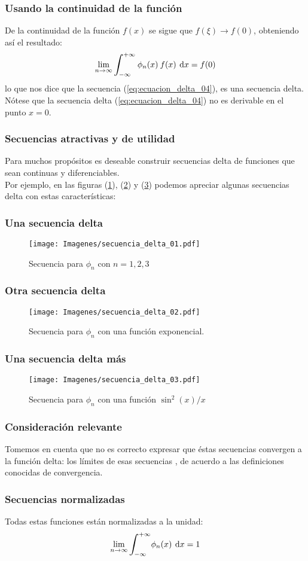 \documentclass[12pt]{beamer}
\begin{document}
\begin{frame}
\frametitle{Usando la continuidad de la función}
De la continuidad de la función $f (x)$ se sigue que $f (\xi) \to f (0)$, obteniendo así el resultado:
\pause
\begin{align*}
\lim_{n \to \infty} \scaleint{6ex}_{\bs -\infty}^{+ \infty} \: \phi_{n} (x) \: f (x) \: \dd{x} = f (0)
\end{align*}
lo que nos dice que la secuencia (\ref{eq:ecuacion_delta_04}), es una secuencia delta. \pause  Nótese que la secuencia delta (\ref{eq:ecuacion_delta_04}) no es derivable en el punto $x = 0$.
\end{frame}
\begin{frame}
\frametitle{Secuencias atractivas y de utilidad}
Para muchos propósitos es deseable construir secuencias delta de funciones que sean continuas y diferenciables.
\\
\bigskip
\pause 
Por ejemplo, en las figuras (\ref{fig:plot_secuencia_01}), (\ref{fig:plot_secuencia_02}) y (\ref{fig:plot_secuencia_03}) podemos apreciar algunas secuencias delta con estas características:
\end{frame}
\begin{frame}[plain]
\frametitle{Una secuencia delta}
\begin{figure}[H]
    \centering
    \texttt{[image: Imagenes/secuencia\_delta\_01.pdf]}
    \caption{Secuencia para $\phi_{n}$ con $n=1,2,3$}
    \label{fig:plot_secuencia_01}
\end{figure}
\end{frame}
\begin{frame}
\frametitle{Otra secuencia delta}
\begin{figure}[H]
    \centering
    \texttt{[image: Imagenes/secuencia\_delta\_02.pdf]}
    \caption{Secuencia para $\phi_{n}$ con una función exponencial.}
    \label{fig:plot_secuencia_02}
\end{figure}
\end{frame}
\begin{frame}
\frametitle{Una secuencia delta más}
\begin{figure}[H]
    \centering
    \texttt{[image: Imagenes/secuencia\_delta\_03.pdf]}
    \caption{Secuencia para $\phi_{n}$ con una función $\sin^{2}(x)/x$}
    \label{fig:plot_secuencia_03}
\end{figure}
\end{frame}
\begin{frame}
\frametitle{Consideración relevante}
Tomemos en cuenta que no es correcto expresar que éstas secuencias convergen a la función delta: \pause los límites de esas secuencias , de acuerdo a las definiciones conocidas de convergencia.
\end{frame}
\begin{frame}
\frametitle{Secuencias normalizadas}
Todas estas funciones están normalizadas a la unidad:
\pause
\begin{equation}
\lim_{n \to \infty} \scaleint{6ex}_{\bs - \infty}^{+ \infty} \phi_{n} (x) \: \dd{x} = 1
\label{eq:ecuacion_delta_05}
\end{equation}
\end{frame}
\end{document}
